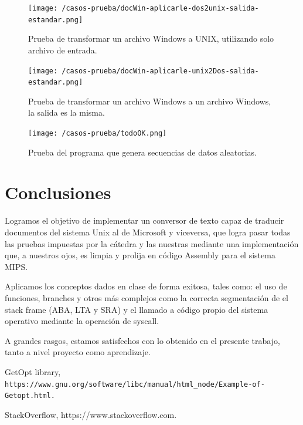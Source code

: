 \documentclass[a4paper]{article}
\begin{document}
\begin{figure}[!htp]
\begin{center}
\texttt{[image: /casos-prueba/docWin-aplicarle-dos2unix-salida-estandar.png]}
\caption{Prueba de transformar un archivo Windows a UNIX, utilizando solo archivo de entrada.} \label{fig001}
\end{center}
\end{figure}

\begin{figure}[!htp]
\begin{center}
\texttt{[image: /casos-prueba/docWin-aplicarle-unix2Dos-salida-estandar.png]}
\caption{Prueba de transformar un archivo Windows a un archivo Windows, la salida es la misma.} \label{fig001}
\end{center}
\end{figure}

\begin{figure}[!htp]
\begin{center}
\texttt{[image: /casos-prueba/todoOK.png]}
\caption{Prueba del programa que genera secuencias de datos aleatorias.} \label{fig001}
\end{center}
\end{figure}

\pagebreak


\section{Conclusiones}

Logramos el objetivo de implementar un conversor de texto capaz de traducir documentos del sistema Unix al de Microsoft y viceversa, que logra pasar todas las pruebas impuestas por la cátedra y las nuestras mediante una implementación que, a nuestros ojos, es limpia y prolija en código Assembly para el sistema MIPS. 

Aplicamos los conceptos dados en clase de forma exitosa, tales como: el uso de funciones, branches y otros más complejos como la correcta segmentación de el stack frame (ABA, LTA y SRA) y el llamado a código propio del sistema operativo mediante la operación de syscall. 

A grandes rasgos, estamos satisfechos con lo obtenido en el presente trabajo, tanto a nivel proyecto como aprendizaje.

\begin{thebibliography}{2}

 GetOpt library, 
\texttt{https://www.gnu.org/software/libc/manual/html_node/Example-of-Getopt.html.}

 StackOverflow, https://www.stackoverflow.com.

\end{thebibliography}
\end{document}
